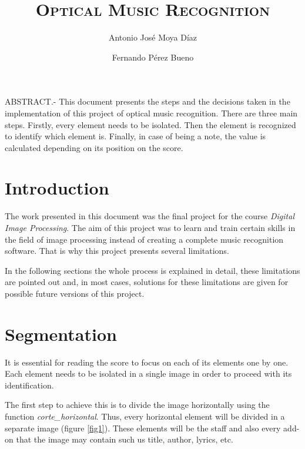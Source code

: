 \documentclass[10pt, a4paper]{article}
\title{\textsc{Optical Music Recognition}}
\author{Antonio José Moya Díaz \and Fernando Pérez Bueno}
\date{}
\begin{document}
\maketitle

ABSTRACT.- This document presents the steps and the decisions taken in the implementation of this project of optical music recognition. There are three main steps. Firstly, every element needs to be isolated. Then the element is recognized to identify which element is. Finally, in case of being a note, the value is calculated depending on its position on the score.


\section{Introduction}

The work presented in this document was the final project for the course \emph{Digital Image Processing}. The aim of this project was to learn and train certain skills in the field of image processing instead of creating a complete music recognition software. That is why this project presents several limitations. 

In the following sections the whole process is explained in detail, these limitations are pointed out and, in most cases, solutions for these limitations are given for possible future versions of this project.


\section{Segmentation}

It is essential for reading the score to focus on each of its elements one by one. Each element needs to be isolated in a single image in order to proceed with its identification.

The first step to achieve this is to divide the image horizontally using the function \emph{corte\_horizontal}. Thus, every horizontal element will be divided in a separate image (figure \ref{fig1}). These elements will be the staff and also every add-on that the image may contain such us title, author, lyrics, etc.
\end{document}
